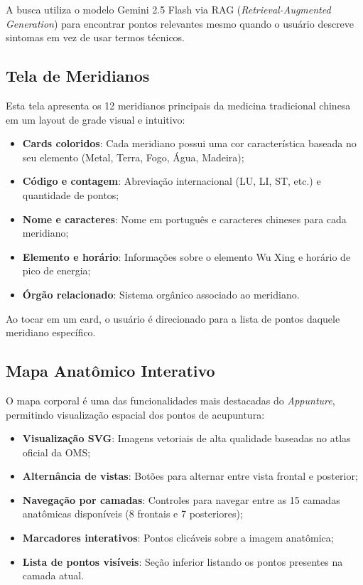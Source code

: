 A busca utiliza o modelo Gemini 2.5 Flash via RAG (\textit{Retrieval-Augmented Generation}) para encontrar pontos relevantes mesmo quando o usuário descreve sintomas em vez de usar termos técnicos.


\subsection{Tela de Meridianos}

Esta tela apresenta os 12 meridianos principais da medicina tradicional chinesa em um layout de grade visual e intuitivo:

\begin{itemize}
    \item \textbf{Cards coloridos}: Cada meridiano possui uma cor característica baseada no seu elemento (Metal, Terra, Fogo, Água, Madeira);
    \item \textbf{Código e contagem}: Abreviação internacional (LU, LI, ST, etc.) e quantidade de pontos;
    \item \textbf{Nome e caracteres}: Nome em português e caracteres chineses para cada meridiano;
    \item \textbf{Elemento e horário}: Informações sobre o elemento Wu Xing e horário de pico de energia;
    \item \textbf{Órgão relacionado}: Sistema orgânico associado ao meridiano.
\end{itemize}

Ao tocar em um card, o usuário é direcionado para a lista de pontos daquele meridiano específico.


\subsection{Mapa Anatômico Interativo}

O mapa corporal é uma das funcionalidades mais destacadas do \textit{Appunture}, permitindo visualização espacial dos pontos de acupuntura:

\begin{itemize}
    \item \textbf{Visualização SVG}: Imagens vetoriais de alta qualidade baseadas no atlas oficial da OMS;
    \item \textbf{Alternância de vistas}: Botões para alternar entre vista frontal e posterior;
    \item \textbf{Navegação por camadas}: Controles para navegar entre as 15 camadas anatômicas disponíveis (8 frontais e 7 posteriores);
    \item \textbf{Marcadores interativos}: Pontos clicáveis sobre a imagem anatômica;
    \item \textbf{Lista de pontos visíveis}: Seção inferior listando os pontos presentes na camada atual.
\end{itemize}

